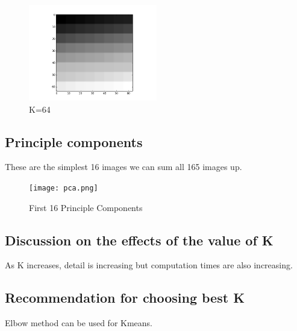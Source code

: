 \documentclass[conference]{IEEEtran}
\begin{document}
    \begin{figure}[htbp]
        \centerline{\includegraphics[width=0.5\textwidth]{64.png}}
        \caption{K=64}
        \label{k64}
    \end{figure}



    \subsection{Principle components}

    These are the simplest 16 images we can sum all 165 images up.

    \begin{figure}[htbp]
        \centerline{\texttt{[image: pca.png]}}
        \caption{First 16 Principle Components}
        \label{pca}
    \end{figure}




    \subsection{Discussion on the effects of the value of K}

    As K increases, detail is increasing but computation times are also increasing.

    \subsection{Recommendation for choosing best K}

    Elbow method can be used for Kmeans.
\end{document}
